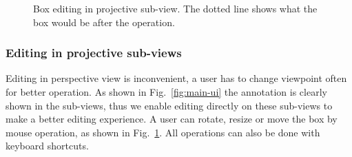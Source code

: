 \documentclass[letterpaper, 10 pt, conference]{ieeeconf}  %
\begin{document}
\begin{figure}[t]
	\centering
	\caption{Box editing in projective sub-view. The dotted line shows what the box would be after the operation.}
	\label{fig:box-mouse-edit-subview}
\end{figure}

\subsubsection{Editing in projective sub-views}
Editing in perspective view is inconvenient,  a user has to change viewpoint often for better operation. As shown in Fig.~\ref{fig:main-ui} the annotation is clearly shown in the sub-views, thus we enable editing directly on these sub-views to make a better editing experience. A user can rotate, resize or move the box by mouse operation, as shown in Fig.~\ref{fig:box-mouse-edit-subview}.
All operations can also be done with keyboard shortcuts.
\end{document}
